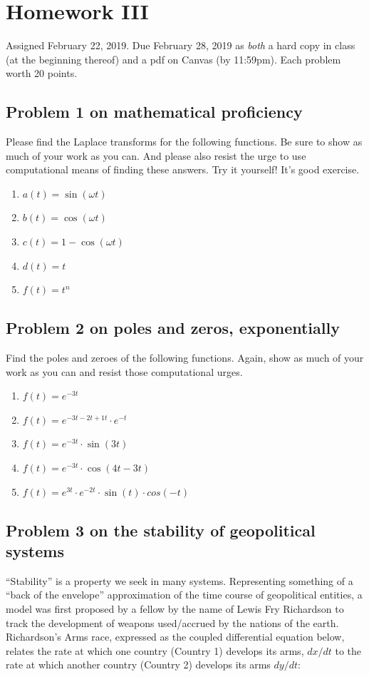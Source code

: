 \documentclass[11pt]{book}
\begin{document}
\chapter*{Homework III}
Assigned February 22, 2019. Due February 28, 2019 as \textit{both} a hard copy in class (at the beginning thereof) and a pdf on Canvas (by 11:59pm). Each problem worth 20 points.
\setcounter{chapter}{3}
\setcounter{section}{0}


\section{Problem 1 on mathematical proficiency}
Please find the Laplace transforms for the following functions. Be sure to show as much of your work as you can. And please also resist the urge to use computational means of finding these answers. Try it yourself! It's good exercise.

\begin{enumerate}
	\item $a(t) = \sin(\omega t)$
	\item $b(t) = \cos(\omega t)$
	\item $c(t) = 1 - \cos(\omega t)$
	\item $d(t) = t$
	\item $f(t) = t^n$
\end{enumerate}

\newpage

\section{Problem 2 on poles and zeros, exponentially}

Find the poles and zeroes of the following functions. Again, show as much of your work as you can and resist those computational urges.

\begin{enumerate}
	\item $f(t) = e^{-3t}$
	\item $f(t) = e^{-3t - 2t + 1t}\cdot e^{-t}$
	\item $f(t) = e^{-3t}\cdot \sin(3t)$
	\item $f(t) = e^{-3t}\cdot \cos(4t - 3t)$
	\item $f(t) = e^{3t}\cdot e^{-2t} \cdot \sin(t)\cdot cos (-t)$
\end{enumerate}

\section{Problem 3 on the stability of geopolitical systems}
``Stability'' is a property we seek in many systems. Representing something of a ``back of the envelope'' approximation of the time course of geopolitical entities, a model was first proposed by a fellow by the name of Lewis Fry Richardson to track the development of weapons used/accrued by the nations of the earth. Richardson's Arms race, expressed as the coupled differential equation below, relates the rate at which one country (Country 1) develops its arms, $dx/dt$ to the rate at which another country (Country 2) develops its arms $dy/dt$:
\end{document}
